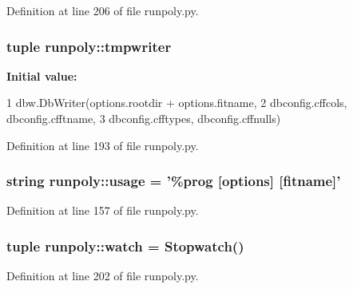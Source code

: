 Definition at line 206 of file runpoly.py.

\hypertarget{namespacerunpoly_ac9f61a81e4f1d37afe226eb29a552c68}{
\subsubsection[{tmpwriter}]{\setlength{\rightskip}{0pt plus 5cm}tuple {\bf runpoly::tmpwriter}}}
\label{namespacerunpoly_ac9f61a81e4f1d37afe226eb29a552c68}
{\bfseries Initial value:}
\begin{DoxyCode}
1 dbw.DbWriter(options.rootdir + options.fitname, 
2                              dbconfig.cffcols, dbconfig.cfftname, 
3                              dbconfig.cfftypes, dbconfig.cffnulls)
\end{DoxyCode}


Definition at line 193 of file runpoly.py.

\hypertarget{namespacerunpoly_aac16bfb405f5f32d626a3c0bd057a781}{
\subsubsection[{usage}]{\setlength{\rightskip}{0pt plus 5cm}string {\bf runpoly::usage} = '\%prog \mbox{[}options\mbox{]} \mbox{[}fitname\mbox{]}'}}
\label{namespacerunpoly_aac16bfb405f5f32d626a3c0bd057a781}


Definition at line 157 of file runpoly.py.

\hypertarget{namespacerunpoly_ac573a8d4d7a1ebbf405bd0b69fa9361b}{
\subsubsection[{watch}]{\setlength{\rightskip}{0pt plus 5cm}tuple {\bf runpoly::watch} = Stopwatch()}}
\label{namespacerunpoly_ac573a8d4d7a1ebbf405bd0b69fa9361b}


Definition at line 202 of file runpoly.py.

